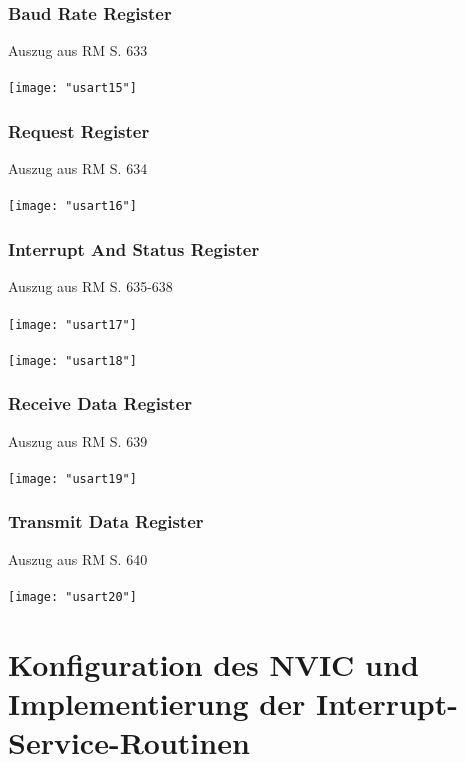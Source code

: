 \documentclass[11pt]{report}
\begin{document}
			\subsubsection{Baud Rate Register}
				Auszug aus RM S. 633\\
				\\\texttt{[image: "usart15"]}\\
			\subsubsection{Request Register}
				Auszug aus RM S. 634\\
				\\\texttt{[image: "usart16"]}\\
			\subsubsection{Interrupt And Status Register}
				Auszug aus RM S. 635-638\\
				\\\texttt{[image: "usart17"]}\\
				\\\texttt{[image: "usart18"]}\\
			\subsubsection{Receive Data Register}
				Auszug aus RM S. 639\\
				\\\texttt{[image: "usart19"]}\\
			\subsubsection{Transmit Data Register}
				Auszug aus RM S. 640\\
				\\\texttt{[image: "usart20"]}\\
	\section{Konfiguration des NVIC und Implementierung der Interrupt-Service-Routinen}
\end{document}
